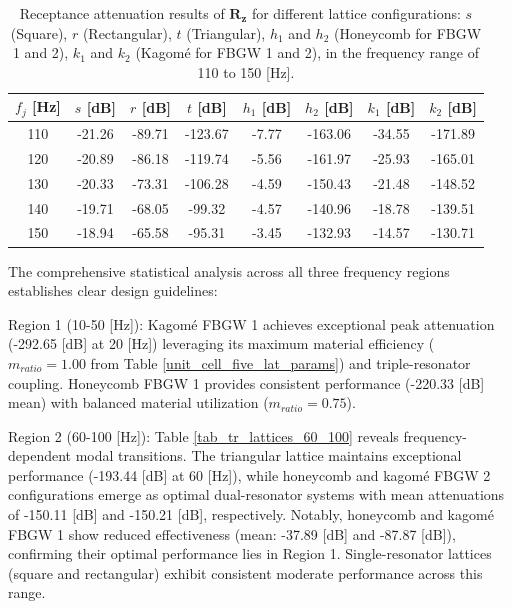 \documentclass[review,numbers,sort&compress]{elsarticle}
\begin{document}
\begin{table}[htb]
    \centering
    \caption{Receptance attenuation results of $\mathbf{R_z}$ for different lattice configurations: \( s \) (Square), \( r \) (Rectangular), \( t \) (Triangular), \( h_1 \) and \( h_2 \) (Honeycomb for FBGW 1 and 2), \( k_1 \) and \( k_2 \) (Kagomé for FBGW 1 and 2), in the frequency range of 110 to 150 [Hz].}
    \begin{tabular}{cccccccc}
        $f_j$ [Hz] & $s$  [dB] & $r$  [dB] & $t$  [dB] & $h_1$ [dB] & $h_2$ [dB] & $k_1$ [dB] & $k_2$ [dB] \\ \hline
        110        & -21.26            & -89.71                  & -123.67               & -7.77                & -163.06                 & -34.55                & -171.89               \\ \hline
        120        & -20.89            & -86.18                  & -119.74               & -5.56                & -161.97                 & -25.93                & -165.01               \\ \hline
        130        & -20.33            & -73.31                  & -106.28               & -4.59                & -150.43                 & -21.48                & -148.52               \\ \hline
        140        & -19.71            & -68.05                  & -99.32                & -4.57                & -140.96                 & -18.78                & -139.51               \\ \hline
        150        & -18.94            & -65.58                  & -95.31                & -3.45                & -132.93                 & -14.57                & -130.71               \\ \hline
    \end{tabular}
    \label{tab_tr_lattices_110_150}
\end{table}

The comprehensive statistical analysis across all three frequency regions establishes clear design guidelines:

Region 1 (10-50 [Hz]): Kagomé FBGW 1 achieves exceptional peak attenuation (-292.65 [dB] at 20 [Hz]) leveraging its maximum material efficiency ($m_{ratio} = 1.00$ from Table \ref{unit_cell_five_lat_params}) and triple-resonator coupling. Honeycomb FBGW 1 provides consistent performance (-220.33 [dB] mean) with balanced material utilization ($m_{ratio} = 0.75$).

Region 2 (60-100 [Hz]): Table \ref{tab_tr_lattices_60_100} reveals frequency-dependent modal transitions. The triangular lattice maintains exceptional performance (-193.44 [dB] at 60 [Hz]), while honeycomb and kagomé FBGW 2 configurations emerge as optimal dual-resonator systems with mean attenuations of -150.11 [dB] and -150.21 [dB], respectively. Notably, honeycomb and kagomé FBGW 1 show reduced effectiveness (mean: -37.89 [dB] and -87.87 [dB]), confirming their optimal performance lies in Region 1. Single-resonator lattices (square and rectangular) exhibit consistent moderate performance across this range.
\end{document}
